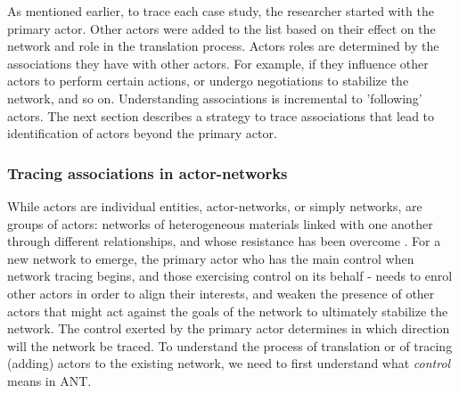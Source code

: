 As mentioned earlier, to trace each case study, the researcher started with the primary actor. Other actors were added to the list based on their effect on the network and role in the translation process. Actors roles are determined by the associations they have with other actors. For example, if they influence other actors to perform certain actions, or undergo negotiations to stabilize the network, and so on. Understanding associations is incremental to 'following' actors. The next section describes a strategy to trace associations that lead to identification of actors beyond the primary actor.

\subsubsection{Tracing associations in actor-networks}
While actors are individual entities, actor-networks, or simply networks, are groups of actors: networks of heterogeneous materials linked with one another through different relationships, and whose resistance has been overcome \cite{law1992notes}. For a new network to emerge, the primary actor who has the main control when network tracing begins, and those exercising control on its behalf - needs to enrol other actors in order to align their interests, and weaken the presence of other actors that might act against the goals of the network to ultimately stabilize the network. The control exerted by the primary actor determines in which direction will the network be traced. To understand the process of translation or of tracing (adding) actors to the existing network, we need to first understand what \textit{control} means in ANT.

